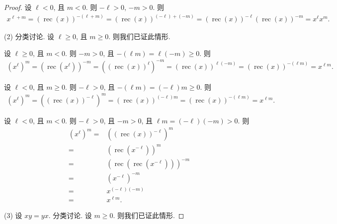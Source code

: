 \documentclass[../libro.tex]{subfiles}
\begin{document}
\begin{proof}
    设 \(\ell < 0\), 且 \(m < 0\).
    则 \(-\ell > 0\), \(-m > 0\).
    则
    \begin{align*}
        x^{\ell + m}
        = (\operatorname{rec} {(x)})^{-(\ell + m)}
        = (\operatorname{rec} {(x)})^{(-\ell) + (-m)}
        = (\operatorname{rec} {(x)})^{-\ell}
        (\operatorname{rec} {(x)})^{-m}
        = x^\ell x^m.
    \end{align*}

    (2)
    分类讨论.
    设 \(\ell \geq 0\), 且 \(m \geq 0\).
    则我们已证此情形.

    设 \(\ell \geq 0\), 且 \(m < 0\).
    则 \(-m > 0\), 且 \(-(\ell m) = \ell (-m) \geq 0\).
    则
    \begin{align*}
        (x^\ell)^m
        = (\operatorname{rec} {(x^\ell)})^{-m}
        = ((\operatorname{rec} {(x)})^{\ell})^{-m}
        = (\operatorname{rec} {(x)})^{\ell (-m)}
        = (\operatorname{rec} {(x)})^{-(\ell m)}
        = x^{\ell m}.
    \end{align*}

    设 \(\ell < 0\), 且 \(m \geq 0\).
    则 \(-\ell > 0\), 且 \(-(\ell m) = (-\ell) m \geq 0\).
    则
    \begin{align*}
        (x^\ell)^m
        = ((\operatorname{rec} {(x)})^{-\ell})^m
        = (\operatorname{rec} {(x)})^{(-\ell) m}
        = (\operatorname{rec} {(x)})^{-(\ell m)}
        = x^{\ell m}.
    \end{align*}

    设 \(\ell < 0\), 且 \(m < 0\).
    则 \(-\ell > 0\), 且 \(-m > 0\),
    且 \(\ell m = (-\ell) (-m) > 0\).
    则
    \begin{align*}
        (x^\ell)^m
        = {} &
        ((\operatorname{rec} {(x)})^{-\ell})^m
        \\
        = {} &
        (\operatorname{rec} {(x^{-\ell})})^m
        \\
        = {} &
        (\operatorname{rec} {(\operatorname{rec} {(x^{-\ell})})})^{-m}
        \\
        = {} &
        (x^{-\ell})^{-m}
        \\
        = {} &
        x^{(-\ell) (-m)}
        \\
        = {} &
        x^{\ell m}.
    \end{align*}

    (3)
    设 \(x y = y x\).
    分类讨论.
    设 \(m \geq 0\).
    则我们已证此情形.


\end{proof}
\end{document}
